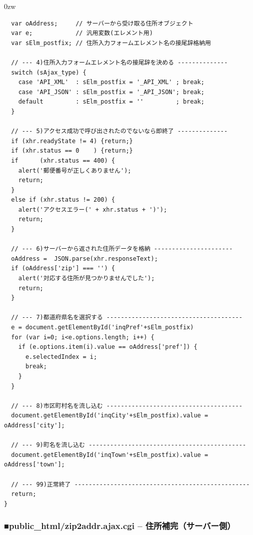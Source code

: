 \begin{indentation}{-9mm}{0zw}
\begin{verbatim}
  var oAddress;     // サーバーから受け取る住所オブジェクト
  var e;            // 汎用変数(エレメント用)
  var sElm_postfix; // 住所入力フォームエレメント名の接尾辞格納用

  // --- 4)住所入力フォームエレメント名の接尾辞を決める --------------
  switch (sAjax_type) {
    case 'API_XML'  : sElm_postfix = '_API_XML' ; break;
    case 'API_JSON' : sElm_postfix = '_API_JSON'; break;
    default         : sElm_postfix = ''         ; break;
  }

  // --- 5)アクセス成功で呼び出されたのでないなら即終了 --------------
  if (xhr.readyState != 4) {return;}
  if (xhr.status == 0    ) {return;}
  if      (xhr.status == 400) {
    alert('郵便番号が正しくありません');
    return;
  }
  else if (xhr.status != 200) {
    alert('アクセスエラー(' + xhr.status + ')');
    return;
  }

  // --- 6)サーバーから返された住所データを格納 ----------------------
  oAddress =  JSON.parse(xhr.responseText);
  if (oAddress['zip'] === '') {
    alert('対応する住所が見つかりませんでした');
    return;
  }

  // --- 7)都道府県名を選択する --------------------------------------
  e = document.getElementById('inqPref'+sElm_postfix)
  for (var i=0; i<e.options.length; i++) {
    if (e.options.item(i).value == oAddress['pref']) {
      e.selectedIndex = i;
      break;
    }
  }

  // --- 8)市区町村名を流し込む --------------------------------------
  document.getElementById('inqCity'+sElm_postfix).value = oAddress['city'];

  // --- 9)町名を流し込む --------------------------------------------
  document.getElementById('inqTown'+sElm_postfix).value = oAddress['town'];

  // --- 99)正常終了 -------------------------------------------------
  return;
}
\end{verbatim}
\end{indentation}


\subsubsection*{■public\_{}html/zip2addr.ajax.cgi -- 住所補完（サーバー側）}

